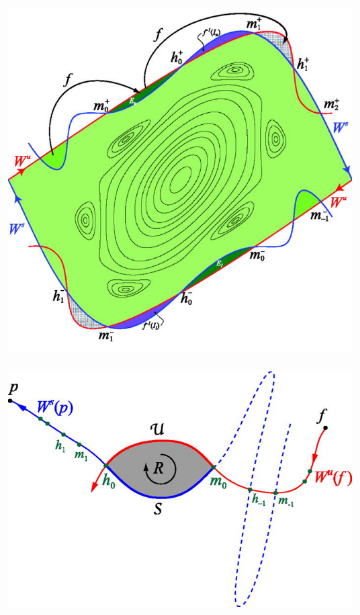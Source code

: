 \begin{figure}[h!]
    \centering
    \begin{subfigure}[t]{0.49\textwidth}
        \centering
        \includegraphics[width=\textwidth]{images/turnstile/01Resonance.png}
        \caption{}
        \label{fig:}
    \end{subfigure}
    \hfill
    \begin{subfigure}[t]{0.49\textwidth}
        \centering
        \includegraphics[width=\textwidth]{images/turnstile/2DLobe.png}
        \caption{}
        \label{}
    \end{subfigure}
    \caption{\cite{meiss_thirty_2015}}
    \label{}
\end{figure}

